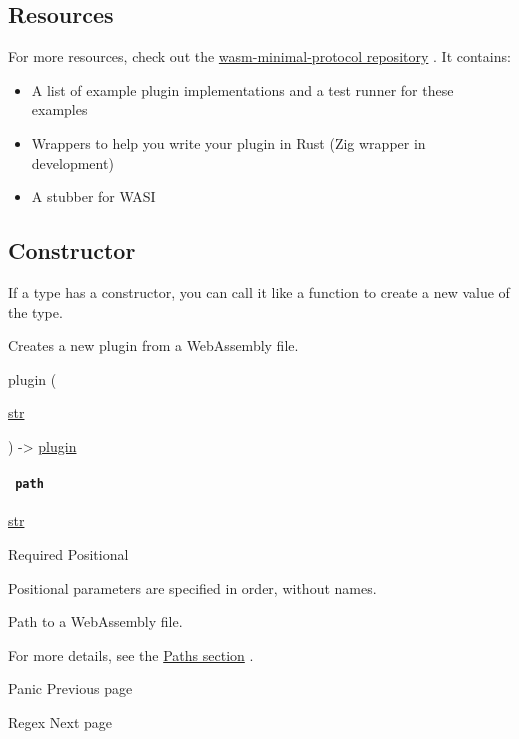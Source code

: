 \subsection{Resources}\label{resources}

For more resources, check out the
\href{https://github.com/astrale-sharp/wasm-minimal-protocol}{wasm-minimal-protocol
repository} . It contains:

\begin{itemize}
\tightlist
\item
  A list of example plugin implementations and a test runner for these
  examples
\item
  Wrappers to help you write your plugin in Rust (Zig wrapper in
  development)
\item
  A stubber for WASI
\end{itemize}

\subsection{\texorpdfstring{Constructor
{}}{Constructor }}\label{constructor}

\label{constructor-constructor-tooltip}
If a type has a constructor, you can call it like a function to create a
new value of the type.

Creates a new plugin from a WebAssembly file.

{ plugin } (

{ \href{/docs/reference/foundations/str/}{str} }

) -\textgreater{} \href{/docs/reference/foundations/plugin/}{plugin}

\paragraph{\texorpdfstring{\texttt{\ path\ }}{ path }}\label{constructor-path}

\href{/docs/reference/foundations/str/}{str}

{Required} {{ Positional }}

\label{constructor-path-positional-tooltip}
Positional parameters are specified in order, without names.

Path to a WebAssembly file.

For more details, see the \href{/docs/reference/syntax/\#paths}{Paths
section} .

\href{/docs/reference/foundations/panic/}{\pandocbounded{}}

{ Panic } { Previous page }

\href{/docs/reference/foundations/regex/}{\pandocbounded{}}

{ Regex } { Next page }
